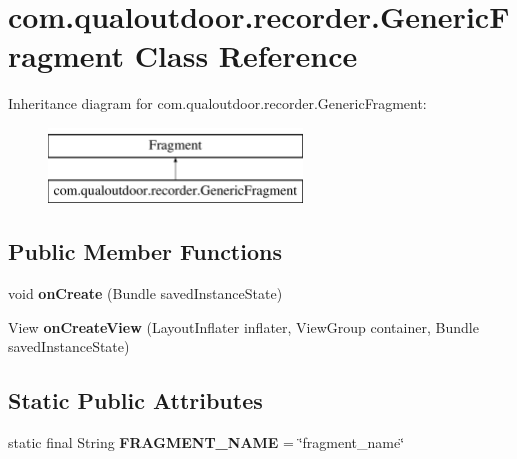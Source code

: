 \hypertarget{classcom_1_1qualoutdoor_1_1recorder_1_1GenericFragment}{\section{com.\-qualoutdoor.\-recorder.\-Generic\-Fragment Class Reference}
\label{classcom_1_1qualoutdoor_1_1recorder_1_1GenericFragment}
}
Inheritance diagram for com.\-qualoutdoor.\-recorder.\-Generic\-Fragment\-:\begin{figure}[H]
\begin{center}
\leavevmode
\includegraphics[height=2.000000cm]{classcom_1_1qualoutdoor_1_1recorder_1_1GenericFragment}
\end{center}
\end{figure}
\subsection*{Public Member Functions}
\begin{DoxyCompactItemize}
\item 
\hypertarget{classcom_1_1qualoutdoor_1_1recorder_1_1GenericFragment_a6e5febce9c3aee57b19b8f0aa25229cd}{void {\bfseries on\-Create} (Bundle saved\-Instance\-State)}\label{classcom_1_1qualoutdoor_1_1recorder_1_1GenericFragment_a6e5febce9c3aee57b19b8f0aa25229cd}

\item 
\hypertarget{classcom_1_1qualoutdoor_1_1recorder_1_1GenericFragment_a0d7034fbb93cf8bfdb55fe5668f63896}{View {\bfseries on\-Create\-View} (Layout\-Inflater inflater, View\-Group container, Bundle saved\-Instance\-State)}\label{classcom_1_1qualoutdoor_1_1recorder_1_1GenericFragment_a0d7034fbb93cf8bfdb55fe5668f63896}

\end{DoxyCompactItemize}
\subsection*{Static Public Attributes}
\begin{DoxyCompactItemize}
\item 
\hypertarget{classcom_1_1qualoutdoor_1_1recorder_1_1GenericFragment_a49ec6e272a29d2f83d75597ad4820186}{static final String {\bfseries F\-R\-A\-G\-M\-E\-N\-T\-\_\-\-N\-A\-M\-E} = \char`\"{}fragment\-\_\-name\char`\"{}}\label{classcom_1_1qualoutdoor_1_1recorder_1_1GenericFragment_a49ec6e272a29d2f83d75597ad4820186}

\end{DoxyCompactItemize}
